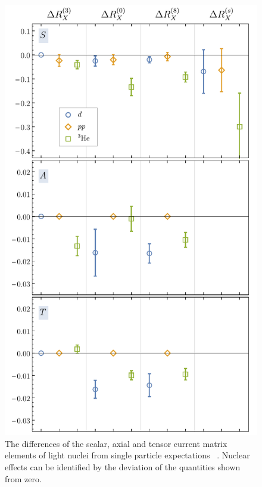 %
\begin{figure}
	\vspace*{-0cm}
	\centering
	\includegraphics[width=0.95\columnwidth]{figures/RatioSummary.pdf}  
	\caption{ 
		The differences of the scalar, axial and tensor current matrix elements of light nuclei from single particle expectations ~\protect\cite{Chang:2017eiq}. Nuclear effects can be identified by the deviation of the quantities shown from zero.   
	}
	\label{fig:SAT}
	\vspace*{-0.5cm}
\end{figure}
%
